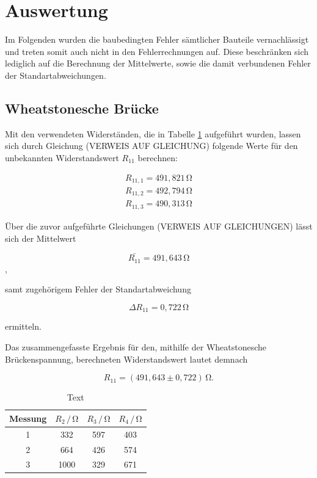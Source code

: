 \section{Auswertung}
\label{sec:Auswertung}

Im Folgenden wurden die baubedingten Fehler sämtlicher Bauteile vernachlässigt und 
treten somit auch nicht in den Fehlerrechnungen auf. Diese beschränken sich lediglich auf 
die Berechnung der Mittelwerte, sowie die damit verbundenen Fehler der Standartabweichungen.


\subsection{Wheatstonesche Brücke}

Mit den verwendeten Widerständen, die in Tabelle \ref{tab:1} aufgeführt wurden, 
lassen sich durch Gleichung (VERWEIS AUF GLEICHUNG) folgende Werte für den 
unbekannten Widerstandswert $R_{11}$ berechnen:

\begin{align}
R_{11,1} = 491,821\,\si{\ohm} \nonumber \\
R_{11,2} = 492,794\,\si{\ohm} \nonumber \\
R_{11,3} = 490,313\,\si{\ohm} \nonumber 
\end{align}

\noindent
Über die zuvor aufgeführte Gleichungen (VERWEIS AUF GLEICHUNGEN) lässt sich der  
Mittelwert 

\begin{equation}
\bar{R_{11}} = 491,643\,\si{\ohm} \nonumber
\end{equation}, 

\noindent
samt zugehörigem Fehler der Standartabweichung

\begin{equation}
\Delta R_{11} = 0,722\, \si{\ohm} \nonumber
\end{equation}

\noindent 
ermitteln.

\noindent
Das zusammengefasste Ergebnis für den, mithilfe der Wheatstonesche Brückenspannung, berechneten Widerstandswert
lautet demnach

\begin{equation}
R_{11} = (491,643 \pm 0,722)\,  \si{\ohm}. \nonumber
\end{equation}
    
\begin{table}
\normalsize

\centering
{}
\begin{tabular}{c c c c}
\toprule
        Messung & $R_{2} \,/\,\si{\ohm}$ & $R_{3} \,/\,\si{\ohm}$ & $R_{4} \,/\,\si{\ohm}$ \\
        \midrule
        1 & 332 & 597 & 403  \\
        2 & 664 & 426 & 574  \\
        3 & 1000 & 329 & 671 \\ 

\bottomrule

\end{tabular}

\caption{Text}
\label{tab:1}
\end{table}

